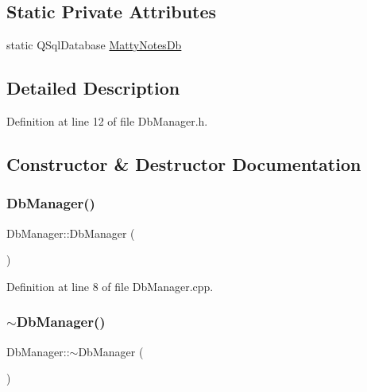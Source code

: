 \subsection*{Static Private Attributes}
\begin{DoxyCompactItemize}
\item 
static Q\+Sql\+Database \hyperlink{classDbManager_a3f6052f559a7a72eef66848ebc9f3eaa}{Matty\+Notes\+Db}
\end{DoxyCompactItemize}


\subsection{Detailed Description}


Definition at line 12 of file Db\+Manager.\+h.



\subsection{Constructor \& Destructor Documentation}
\hypertarget{classDbManager_a0d16cf5bba931362e6c581eb1b5ba66a}{}\label{classDbManager_a0d16cf5bba931362e6c581eb1b5ba66a} 
\subsubsection{\texorpdfstring{Db\+Manager()}{DbManager()}}
{\footnotesize\ttfamily Db\+Manager\+::\+Db\+Manager (\begin{DoxyParamCaption}{ }\end{DoxyParamCaption})}



Definition at line 8 of file Db\+Manager.\+cpp.

\hypertarget{classDbManager_ac5cdf8e5e932d1681ab807d8f256374c}{}\label{classDbManager_ac5cdf8e5e932d1681ab807d8f256374c} 
\subsubsection{\texorpdfstring{$\sim$\+Db\+Manager()}{~DbManager()}}
{\footnotesize\ttfamily Db\+Manager\+::$\sim$\+Db\+Manager (\begin{DoxyParamCaption}{ }\end{DoxyParamCaption})}



